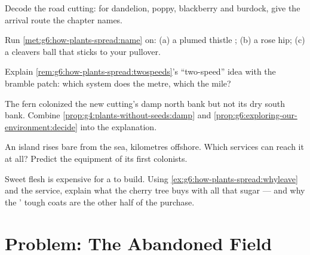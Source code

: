 \begin{exercise}[$\star\star$]\label{exo:g6:how-plants-spread:7}
Decode the road cutting: for dandelion, poppy, blackberry
and burdock, give the arrival route the chapter names.
\end{exercise}

\begin{exercise}[$\star\star$]\label{exo:g6:how-plants-spread:8}
Run \cref{met:g6:how-plants-spread:name} on: (a) a plumed
thistle ; (b) a rose hip; (c) a cleavers ball that
sticks to your pullover.
\end{exercise}

\begin{exercise}[$\star\star$]\label{exo:g6:how-plants-spread:9}
Explain \cref{rem:g6:how-plants-spread:twospeeds}'s
``two-speed'' idea with the bramble patch: which system
does the metre, which the mile?
\end{exercise}

\begin{exercise}[$\star\star$]\label{exo:g6:how-plants-spread:10}
The fern colonized the new cutting's damp north bank but
not its dry south bank. Combine
\cref{prop:g4:plants-without-seeds:damp} and
\cref{prop:g6:exploring-our-environment:decide} into the
explanation.
\end{exercise}

\begin{exercise}[$\star\star$]\label{exo:g6:how-plants-spread:11}
An island rises bare from the sea, kilometres offshore.
Which  services can reach it at all? Predict the
equipment of its first  colonists.
\end{exercise}

\begin{exercise}[$\star\star\star$]\label{exo:g6:how-plants-spread:12}
Sweet flesh is expensive for a  to build. Using
\cref{ex:g6:how-plants-spread:whyleave} and the
 service, explain what the cherry tree buys
with all that sugar --- and why the ' tough coats are
the other half of the purchase.
\end{exercise}

\section{Problem: The Abandoned Field}

